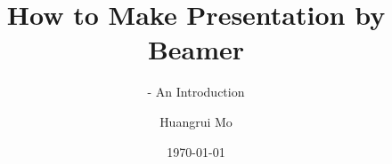 \title[]%
{How to Make Presentation by Beamer}
\subtitle
{ - An Introduction}
\author[] %
{Huangrui Mo}
\date[]
{\today}
\subject{Beamer}

